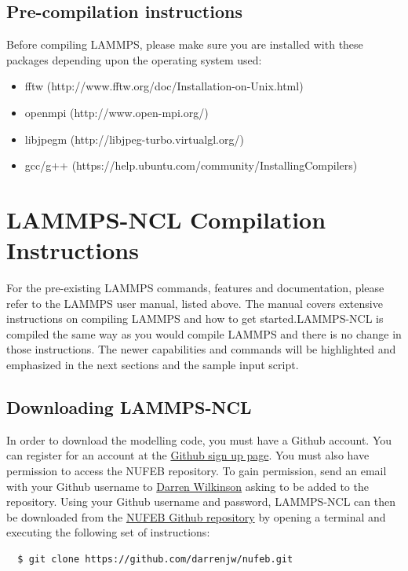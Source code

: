 \documentclass[11pt,a4paper,openright]{article}
\begin{document}
\subsection{Pre-compilation instructions}

Before compiling LAMMPS, please make sure you are installed with these packages depending upon the operating system used:

\begin{itemize}
\item fftw (http://www.fftw.org/doc/Installation-on-Unix.html)
\item openmpi (http://www.open-mpi.org/)
\item libjpegm (http://libjpeg-turbo.virtualgl.org/)
\item gcc/g++ (https://help.ubuntu.com/community/InstallingCompilers)
\end{itemize} 

\section{LAMMPS-NCL Compilation Instructions}
For the pre-existing LAMMPS commands, features and documentation, please refer to the LAMMPS user manual, listed above. The manual covers extensive instructions on compiling LAMMPS and how to get started.LAMMPS-NCL is compiled the same way as you would compile LAMMPS and there is no change in those instructions. The newer capabilities and commands will be highlighted and emphasized in the next sections and the sample input script. 


\subsection{Downloading LAMMPS-NCL}
In order to download the modelling code, you must have a Github account.  You can register for an account at the \href{https://github.com/join}{Github sign up page}.  You must also have permission to access the NUFEB repository.  To gain permission, send an email with your Github username to \href{mailto:darren.wilkinson@newcastle.ac.uk}{Darren Wilkinson} asking to be added to the repository.  Using your Github username and password, LAMMPS-NCL can then be downloaded from the \href{https://github.com/darrenjw/nufeb/tree/master/code}{NUFEB Github repository} by opening a terminal and executing the following set of instructions:

\begin{verbatim}
  $ git clone https://github.com/darrenjw/nufeb.git
\end{verbatim}
\end{document}
